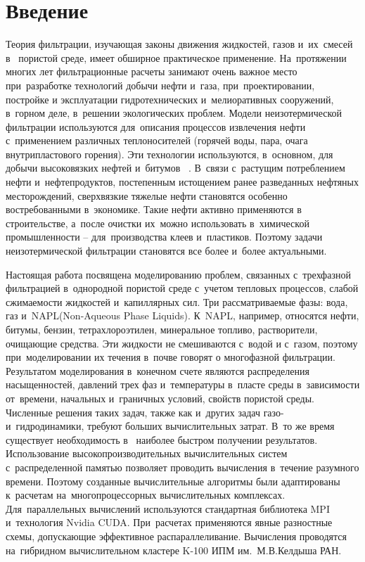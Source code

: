 \section{Введение}
Теория фильтрации, изучающая законы движения жидкостей, газов и~их~смесей в~
пористой среде, имеет обширное практическое применение. На~протяжении многих лет
фильтрационные расчеты занимают очень важное место при~разработке технологий
добычи нефти и~газа, при~проектировании, постройке и эксплуатации
гидротехнических  и~мелиоративных сооружений, в~горном деле, в~решении
экологических проблем.  Модели неизотермической фильтрации используются для~описания
процессов извлечения нефти
с~применением различных теплоносителей (горячей воды, пара, очага внутрипластового
горения). Эти технологии используются, в~основном, для добычи высоковязких нефтей и~битумов ~\cite{Kanevskaya}.
В~связи с~растущим потреблением нефти и~нефтепродуктов, постепенным истощением ранее разведанных
нефтяных месторождений, сверхвязкие тяжелые нефти становятся особенно востребованными в~экономике. 
Такие нефти активно применяются в строительстве, а~после очистки
их~можно использовать в~химической промышленности -- для~производства клеев и~пластиков.
Поэтому задачи неизотермической фильтрации
становятся все более и~более актуальными.

Настоящая работа посвящена моделированию проблем, связанных с~трехфазной фильтрацией 
в~однородной пористой среде с~учетом тепловых процессов, слабой сжимаемости жидкостей
и~капиллярных сил.
Три рассматриваемые фазы: вода, газ и~NAPL(Non-Aqueous Phase 
Liquids). К~NAPL, например, относятся нефти, битумы, бензин, тетрахлороэтилен, 
минеральное топливо, растворители, очищающие средства. 
Эти жидкости не смешиваются с~водой и с~газом,
поэтому при~моделировании их течения
в~почве говорят о многофазной фильтрации.
Результатом моделирования в~конечном счете являются распределения насыщенностей, давлений
трех фаз и~температуры в~пласте среды в~зависимости от~времени, начальных и~граничных
условий, свойств пористой среды. 
Численные решения таких задач, также как и~других задач газо- и~гидродинамики,
требуют больших вычислительных затрат. В~то же время существует необходимость в~
наиболее быстром получении результатов. Использование
высокопроизводительных вычислительных систем с~распределенной памятью
позволяет проводить вычисления в~течение разумного времени. Поэтому созданные
вычислительные алгоритмы были адаптированы к~расчетам на~многопроцессорных
вычислительных комплексах. Для~параллельных вычислений используются стандартная
библиотека MPI и~технология Nvidia CUDA. При~расчетах применяются явные разностные 
схемы, допускающие эффективное распараллеливание. Вычисления проводятся
на~гибридном вычислительном кластере K-100 ИПМ им.~М.В.Келдыша РАН.
